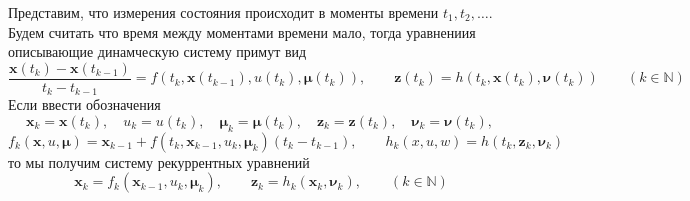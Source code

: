 \documentclass[12pt]{article}
\begin{document}
Представим, что измерения состояния происходит в моменты времени
$t_1, t_2, \ldots $. Будем считать что время между моментами времени мало,
тогда уравнениия описывающие динамческую систему примут вид
\begin{equation}
    \frac{\pmb{x}(t_{k})-\pmb{x}(t_{k-1})}{t_k-t_{k-1}}=f(t_k, \pmb{x}(t_{k-1}), u(t_k), \pmb{\mu}(t_k)), \qquad
    \pmb{z}(t_k)=h(t_k, \pmb{x}(t_k), \pmb{\nu}(t_k)) \qquad
    (k\in\mathbb{N})
\end{equation}
Если ввести обозначения
\begin{equation}
    \pmb{x}_k=\pmb{x}(t_k), \quad
    u_k=u(t_k), \quad
    \pmb{\mu}_k=\pmb{\mu}(t_{k}), \quad
    \pmb{z}_k=\pmb{z}(t_{k}), \quad
    \pmb{\nu}_k=\pmb{\nu}(t_{k}),
\end{equation}
\begin{equation}
    f_k(\pmb{x},u,\pmb{\mu})=\pmb{x}_{k-1}+f(t_k, \pmb{x}_{k-1}, u_k, \pmb{\mu}_k)(t_k - t_{k-1}), \qquad
    h_k(x,u,w)=h(t_k, \pmb{z}_k, \pmb{\nu}_k)
\end{equation}
то мы получим систему рекуррентных уравнений
\begin{equation}\
    \pmb{x}_{k}=f_k(\pmb{x}_{k-1}, u_k, \pmb{\mu}_k), \qquad
    \pmb{z}_k=h_k(\pmb{x}_k, \pmb{\nu}_k), \qquad
    (k\in\mathbb{N})
\end{equation}
\end{document}
